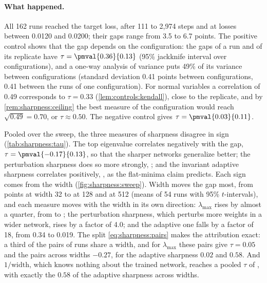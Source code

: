 \begin{refsection}
\paragraph{What happened.} All 162 runs reached the target loss, after 111 to 2,974 steps and at losses between 0.0120 and 0.0200; their gaps range from 3.5 to 6.7 points. The positive control shows that the gap depends on the configuration: the gaps of a run and of its replicate have $\tau=\pmval{0.36}{0.13}$ (95\% jackknife interval over configurations), and a one-way analysis of variance puts 49\% of its variance between configurations (standard deviation 0.41 points between configurations, 0.41 between the runs of one configuration). For normal variables a correlation of 0.49 corresponds to $\tau=0.33$ (\cref{lem:controls:kendall}), close to the replicate, and by \cref{rem:sharpness:ceiling} the best measure of the configuration would reach $\sqrt{0.49}=0.70$, or $\tau\approx0.50$. The negative control gives $\tau=\pmval{0.03}{0.11}$.

Pooled over the sweep, the three measures of sharpness disagree in sign (\cref{tab:sharpness:tau}). The top eigenvalue correlates negatively with the gap, $\tau=\pmval{-0.17}{0.13}$, so that the sharper networks generalize better; the perturbation sharpness does so more strongly, ; and the invariant adaptive sharpness correlates positively, , as the flat-minima claim predicts. Each sign comes from the width (\cref{fig:sharpness:sweep}). Width moves the gap most, from  points at width 32 to  at 128 and  at 512 (means of 54 runs with 95\% $t$-intervals), and each measure moves with the width in its own direction: $\lambda_{\max}$ rises by almost a quarter, from  to ; the perturbation sharpness, which perturbs more weights in a wider network, rises by a factor of 4.0; and the adaptive one falls by a factor of 18, from 0.34 to 0.019. The split \eqref{eq:sharpness:pairs} makes the attribution exact: a third of the pairs of runs share a width, and for $\lambda_{\max}$ these pairs give $\tau=0.05$ and the pairs across widths $-0.27$, for the adaptive sharpness $0.02$ and $0.58$. And $1/\text{width}$, which knows nothing about the trained network, reaches a pooled $\tau$ of , with exactly the $0.58$ of the adaptive sharpness across widths.


\end{refsection}
